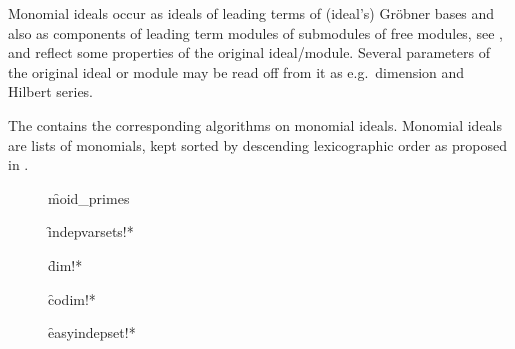Monomial ideals occur as ideals of leading terms of (ideal's) Gr\"obner
bases and also as components of leading term modules of submodules of
free modules, see \cite{Graebe:93a}, and reflect some properties of the
original ideal/module. Several parameters of the original ideal or
module may be read off from it as e.g.\ dimension and Hilbert series.

The  contains the corresponding algorithms on
monomial ideals. Monomial ideals are lists of monomials, kept sorted
by descending lexicographic order as proposed in \cite{BayerStillman:92}.

\begin{description}

\item[]
  \begin{syntax}
    \f{moid\_primes} 
  \end{syntax}
  \hypertarget{procedure:MOID_PRIMES}{}

\item[]
  \begin{syntax}
    \f{indepvarsets!*} 
  \end{syntax}
  \hypertarget{procedure:INDEPVARSETS!*}{}

\item[]
  \begin{syntax}
    \f{dim!*} 
  \end{syntax}
  \hypertarget{procedure:DIM!*}{}

\item[]
  \begin{syntax}
    \f{codim!*} 
  \end{syntax}
  \hypertarget{procedure:CODIM!*}{}

\item[]
  \begin{syntax}
    \f{easyindepset!*} 
  \end{syntax}
  \hypertarget{procedure:EASYINDEPSET!*}{}


\end{description}
